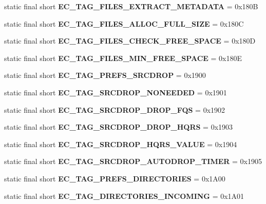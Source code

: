 \begin{DoxyCompactItemize}
\item 
static final short {\bfseries EC\_\-TAG\_\-FILES\_\-EXTRACT\_\-METADATA} = 0x180B\label{interfaceECCodes_af067ead433fc3f44f59d8b9758cb550b}

\item 
static final short {\bfseries EC\_\-TAG\_\-FILES\_\-ALLOC\_\-FULL\_\-SIZE} = 0x180C\label{interfaceECCodes_a33b2c4df44df334ea88dba6a5e377a1d}

\item 
static final short {\bfseries EC\_\-TAG\_\-FILES\_\-CHECK\_\-FREE\_\-SPACE} = 0x180D\label{interfaceECCodes_a545e78f74f8f7cbfb67df6a8824d65fa}

\item 
static final short {\bfseries EC\_\-TAG\_\-FILES\_\-MIN\_\-FREE\_\-SPACE} = 0x180E\label{interfaceECCodes_a0e10a137b482f8bdb5af35a6692c76fc}

\item 
static final short {\bfseries EC\_\-TAG\_\-PREFS\_\-SRCDROP} = 0x1900\label{interfaceECCodes_ae6b54128efd7f5c9a5ed8ef807d108b6}

\item 
static final short {\bfseries EC\_\-TAG\_\-SRCDROP\_\-NONEEDED} = 0x1901\label{interfaceECCodes_a4bdb25b6c6bfb97b81fd8574ac725c37}

\item 
static final short {\bfseries EC\_\-TAG\_\-SRCDROP\_\-DROP\_\-FQS} = 0x1902\label{interfaceECCodes_acbd13456956c786c87b50c27cfc2c19e}

\item 
static final short {\bfseries EC\_\-TAG\_\-SRCDROP\_\-DROP\_\-HQRS} = 0x1903\label{interfaceECCodes_a7bf8b5fd4c7563d4f5e8c32f60e8cc66}

\item 
static final short {\bfseries EC\_\-TAG\_\-SRCDROP\_\-HQRS\_\-VALUE} = 0x1904\label{interfaceECCodes_a0a5ecd2c6c1a2991fdb41cd4a2dcb750}

\item 
static final short {\bfseries EC\_\-TAG\_\-SRCDROP\_\-AUTODROP\_\-TIMER} = 0x1905\label{interfaceECCodes_a7566f63861d6f536059ad3f3b239c1e6}

\item 
static final short {\bfseries EC\_\-TAG\_\-PREFS\_\-DIRECTORIES} = 0x1A00\label{interfaceECCodes_a34b6a144ed50dc7cfe836252dcd6b50d}

\item 
static final short {\bfseries EC\_\-TAG\_\-DIRECTORIES\_\-INCOMING} = 0x1A01\label{interfaceECCodes_a05df5174fafe4b5538832293fec49cce}


\end{DoxyCompactItemize}
